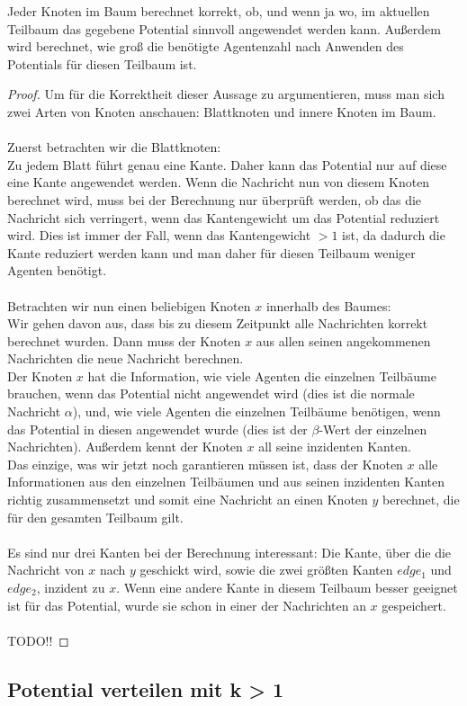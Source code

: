 	\begin{theorem}
		Jeder Knoten im Baum berechnet korrekt, ob, und wenn ja wo, im aktuellen Teilbaum das gegebene Potential sinnvoll angewendet werden kann. Außerdem wird berechnet, wie groß die benötigte Agentenzahl nach Anwenden des Potentials für diesen Teilbaum ist.
	\end{theorem}
	\begin{proof}
		Um für die Korrektheit dieser Aussage zu argumentieren, muss man sich zwei Arten von Knoten anschauen: Blattknoten und innere Knoten im Baum.\\
		\\
		Zuerst betrachten wir die Blattknoten:\\
		Zu jedem Blatt führt genau eine Kante. Daher kann das Potential nur auf diese eine Kante angewendet werden. Wenn die Nachricht nun von diesem Knoten berechnet wird, muss bei der Berechnung nur überprüft werden, ob das die Nachricht sich verringert, wenn das Kantengewicht um das Potential reduziert wird. Dies ist immer der Fall, wenn das Kantengewicht $> 1$ ist, da dadurch die Kante reduziert werden kann und man daher für diesen Teilbaum weniger Agenten benötigt.
		\\
		\\
		Betrachten wir nun einen beliebigen Knoten $x$ innerhalb des Baumes:\\
		Wir gehen davon aus, dass bis zu diesem Zeitpunkt alle Nachrichten korrekt berechnet wurden. Dann muss der Knoten $x$ aus allen seinen angekommenen Nachrichten die neue Nachricht berechnen.\\
		Der Knoten $x$ hat die Information, wie viele Agenten die einzelnen Teilbäume brauchen, wenn das Potential nicht angewendet wird (dies ist die normale Nachricht $\alpha$), und, wie viele Agenten die einzelnen Teilbäume benötigen, wenn das Potential in diesen angewendet wurde (dies ist der $\beta$-Wert der einzelnen Nachrichten). Außerdem kennt der Knoten $x$ all seine inzidenten Kanten.\\
		Das einzige, was wir jetzt noch garantieren müssen ist, dass der Knoten $x$ alle Informationen aus den einzelnen Teilbäumen und aus seinen inzidenten Kanten richtig zusammensetzt und somit eine Nachricht an einen Knoten $y$ berechnet, die für den gesamten Teilbaum gilt.\\
		\\
		Es sind nur drei Kanten bei der Berechnung interessant: Die Kante, über die die Nachricht von $x$ nach $y$ geschickt wird, sowie die zwei größten Kanten $edge_1$ und $edge_2$, inzident zu $x$. Wenn eine andere Kante in diesem Teilbaum besser geeignet ist für das Potential, wurde sie schon in einer der Nachrichten an $x$ gespeichert. 
		\\
		\\
		TODO!!
	\end{proof}
	
	

\subsection{Potential verteilen mit k > 1}